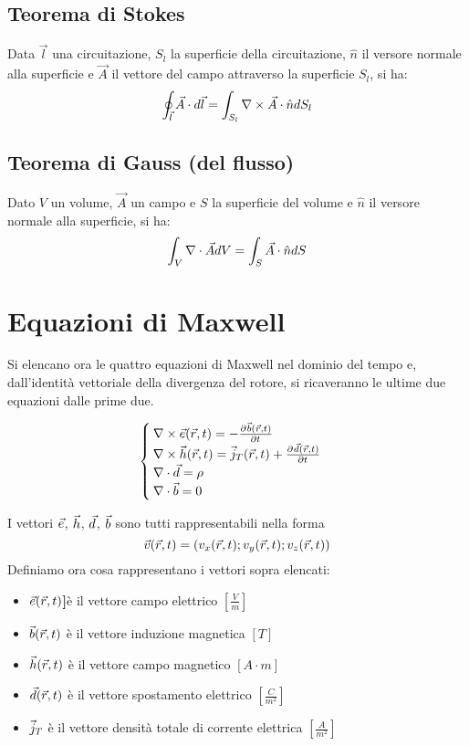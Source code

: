 \subsection{Teorema di Stokes}
Data $\vec{l}$ una circuitazione, $S_l$ la superficie della circuitazione, $\hat{n}$
 il versore normale alla superficie  e $\vec{A}$ il vettore del campo attraverso la superficie $S_l$, si ha:
\begin{equation}
  \oint_{\vec{l}} \vec{A} \cdot d\vec{l} = \int_{S_l}\nabla\times \vec{A} \cdot \hat{n} d S_l
\end{equation}

\subsection{Teorema di Gauss (del flusso)}
Dato $V$ un volume, $\vec{A}$ un campo e $S$ la superficie del volume e $\hat{n}$
il versore normale alla superficie, si ha:
\begin{equation}
  \int_V \nabla\cdot \vec{A} dV = \int_S \vec{A}\cdot \hat{n} dS
\end{equation}

\section{Equazioni di Maxwell}
Si elencano ora le quattro equazioni di Maxwell nel dominio del tempo e, dall'identità
vettoriale della divergenza del rotore, si ricaveranno le ultime due equazioni dalle prime due.

\begin{equation}\begin{cases}
  \nabla\times \vec{e}(\vec{r},t) = -\frac{\partial^{} {\vec{b}(\vec{r},t)}}{\partial {t}^{}} \\
  \nabla\times \vec{h}(\vec{r},t) = \vec{j}_T(\vec{r},t) + \frac{\partial^{} {\vec{d}(\vec{r},t)}}{\partial {t}^{}} \\
  \nabla\cdot \vec{d} = \rho \\
  \nabla\cdot \vec{b} = 0
\end{cases}\label{eq:maxwell}\end{equation}

I vettori $\vec{e}$, $\vec{h}$, $\vec{d}$, $\vec{b}$ sono tutti rappresentabili nella forma
$$\vec{v}(\vec{r},t) = \left(v_x(\vec{r},t);v_y(\vec{r},t);v_z(\vec{r},t)\right)$$
Definiamo ora cosa rappresentano i vettori sopra elencati:
\begin{itemize}
  \item \textbf{$\vec{e}(\vec{r},t)$]}è il vettore campo elettrico $\left[\frac{V}{m}\right]$
  \item \textbf{$\vec{b}(\vec{r},t)$} è il vettore induzione magnetica $[T]$
  \item \textbf{$\vec{h}(\vec{r},t)$} è il vettore campo magnetico $[A \cdot m]$
  \item \textbf{$\vec{d}(\vec{r},t)$} è il vettore spostamento elettrico $\left[\frac{C}{m^2}\right]$
  \item \textbf{$\vec{j}_T$} è il vettore densità totale di corrente elettrica $\left[\frac{A}{m^2}\right]$
\end{itemize}

